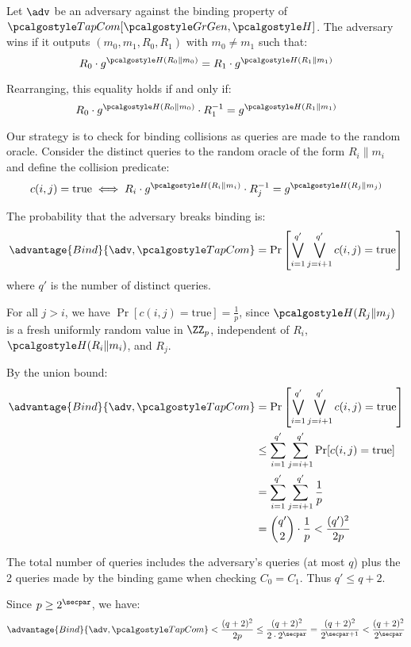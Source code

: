 \ifsolutions
\begin{mysolution}
  Let $\adv$ be an adversary against the binding property of $\algo{TapCom}[\grgen, \algo{H}]$. The adversary wins if it outputs $(m_0, m_1, R_0, R_1)$ with $m_0 \neq m_1$ such that:
  \[
  R_0 \cdot g^{\algo{H}(R_0 \| m_0)} = R_1 \cdot g^{\algo{H}(R_1 \| m_1)}
  \]

  Rearranging, this equality holds if and only if:
  \[
  R_0 \cdot g^{\algo{H}(R_0 \| m_0)} \cdot R_1^{-1} = g^{\algo{H}(R_1 \| m_1)}
  \]

  Our strategy is to check for binding collisions as queries are made to the random oracle.
  Consider the distinct queries to the random oracle of the form $R_i \| m_i$ and define the collision predicate:
  \[
  c(i, j) = \text{true} \iff R_i \cdot g^{\algo{H}(R_i \| m_i)} \cdot R_j^{-1} = g^{\algo{H}(R_j \| m_j)}
  \]
  
  The probability that the adversary breaks binding is:
  \[
  \advantage{Bind}{\adv, \algo{TapCom}} = \Pr\left[\bigvee_{i=1}^{q'} \bigvee_{j=i+1}^{q'} c(i,j) = \text{true}\right]
  \]
  where $q'$ is the number of distinct queries.
  
  For all $j > i$, we have $\Pr[c(i,j) = \text{true}] = \frac{1}{p}$, since $\algo{H}(R_j \| m_j)$ is a fresh uniformly random value in $\ZZ_p$, independent of $R_i$, $\algo{H}(R_i \| m_i)$, and $R_j$.
  
  By the union bound:
  \begin{align}
    \advantage{Bind}{\adv, \algo{TapCom}} &= \Pr\left[\bigvee_{i=1}^{q'} \bigvee_{j=i+1}^{q'} c(i,j) = \text{true}\right] \\
    &\leq \sum_{i=1}^{q'} \sum_{j=i+1}^{q'} \Pr[c(i,j) = \text{true}] \\
    &= \sum_{i=1}^{q'} \sum_{j=i+1}^{q'} \frac{1}{p} \\
    &= \binom{q'}{2} \cdot \frac{1}{p} < \frac{(q')^2}{2p}
  \end{align}
  
  The total number of queries includes the adversary's queries (at most $q$) plus the 2 queries made by the binding game when checking $C_0 = C_1$. Thus $q' \leq q + 2$.
  
  Since $p \geq 2^\secpar$, we have:
  \[
  \advantage{Bind}{\adv, \algo{TapCom}} < \frac{(q+2)^2}{2p} \leq \frac{(q+2)^2}{2 \cdot 2^\secpar} = \frac{(q+2)^2}{2^{\secpar+1}} < \frac{(q+2)^2}{2^\secpar}
  \]
\end{mysolution}
\fi

